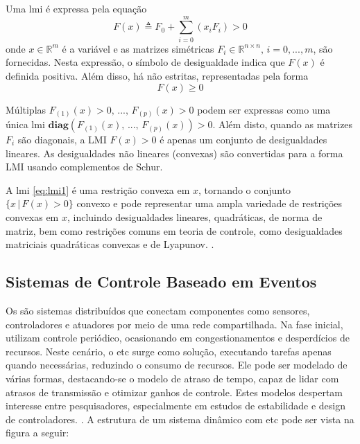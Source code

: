 Uma \acrshort{lmi} é expressa pela equação \begin{equation} F(x) \triangleq F_0 + \sum_{i=0}^{m}(x_iF_i) > 0 \label{eq:lmi1}\end{equation} onde $x \in \mathbb{R}^m$ é a variável e as matrizes simétricas $F_i \in \mathbb{R}^{n \times n}, \, i = 0, . . . , m$, são fornecidas. Nesta expressão, o símbolo de desigualdade indica que $F(x)$ é definida positiva. Além disso, há  não estritas, representadas pela forma \begin{equation} F(x) \geq 0 \end{equation}

Múltiplas   $F_{(1)}(x) > 0, \, ..., \, F_{(p)}(x) > 0$ podem ser expressas como uma única \acrshort{lmi} $\mathbf{diag}(F_{(1)}(x), \, ..., \, F_{(p)}(x)) > 0$. Além disto, quando as matrizes $F_i$ são diagonais, a LMI $F(x) > 0$ é apenas um conjunto de desigualdades lineares. As desigualdades não lineares (convexas) são convertidas para a forma LMI usando complementos de Schur.

A \acrshort{lmi} \eqref{eq:lmi1} é uma restrição convexa em $x$, tornando o conjunto $\{x \, | \, F(x) > 0\}$ convexo e pode representar uma ampla variedade de restrições convexas em $x$, incluindo desigualdades lineares, quadráticas, de norma de matriz, bem como restrições comuns em teoria de controle, como desigualdades matriciais quadráticas convexas e de Lyapunov. \cite{boyd1994}.


\subsection{Sistemas de Controle Baseado em Eventos}

Os  são sistemas distribuídos que conectam componentes como sensores, controladores e atuadores por meio de uma rede compartilhada. Na fase inicial, utilizam controle periódico, ocasionando em congestionamentos e desperdícios de recursos. Neste cenário, o \acrshort{etc} surge como solução, executando tarefas apenas quando necessárias, reduzindo o consumo de recursos. Ele pode ser modelado de várias formas, destacando-se o modelo de atraso de tempo, capaz de lidar com atrasos de transmissão e otimizar ganhos de controle. Estes modelos despertam interesse entre pesquisadores, especialmente em estudos de estabilidade e design de controladores. \cite{peng2018}. A estrutura de um sistema dinâmico com \acrshort{etc} pode ser vista na figura a seguir:

